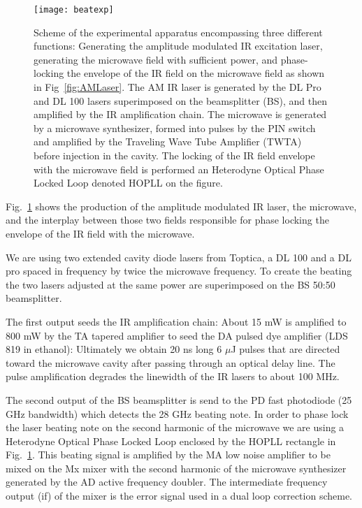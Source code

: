 \documentclass[pra, reprint]{revtex4-1}
\begin{document}
\begin{figure}[h]
  \centering
  \texttt{[image: beatexp]}

  \caption{Scheme of the experimental apparatus encompassing three different functions: Generating the amplitude modulated IR excitation laser, generating the microwave field with sufficient power, and phase-locking the envelope of the IR field on the microwave field as shown in Fig~\ref{fig:AMLaser}.
The AM IR laser is generated by the DL Pro and DL 100 lasers superimposed on the beamsplitter (BS), and then amplified by the IR amplification chain. The microwave is generated by a microwave synthesizer, formed into pulses by the PIN switch and amplified by the Traveling Wave Tube Amplifier (TWTA) before injection in the cavity.
 The locking of the IR field envelope with the microwave field is performed an Heterodyne Optical Phase Locked Loop denoted HOPLL on the figure.}
  \label{fig:exp_scheme}
\end{figure}


Fig.~\ref{fig:exp_scheme} shows the production of the amplitude modulated IR laser, the microwave, and the interplay between those two fields responsible for phase locking the envelope of the IR field with the microwave.


We are using two extended cavity diode lasers from Toptica, a DL 100 and a DL pro spaced in frequency by twice the microwave frequency. To create the beating the two lasers adjusted at the same power are superimposed on the BS 50:50 beamsplitter.

The first output seeds the IR amplification chain: About 15 mW is amplified to 800 mW by the TA tapered amplifier to seed the DA pulsed dye amplifier (LDS 819 in ethanol): Ultimately we obtain 20 ns long 6 $\mu$J pulses that are directed toward the microwave cavity after passing through an optical delay line. The pulse amplification degrades the linewidth of the IR lasers to about 100 MHz.

The second output of the BS beamsplitter is send to the PD fast photodiode (25 GHz bandwidth) which detects the 28 GHz beating note. In order to phase lock the laser beating note on the second harmonic of the microwave we are using a Heterodyne Optical Phase Locked Loop enclosed by the HOPLL rectangle in Fig.~\ref{fig:exp_scheme}.
 This beating signal is amplified by the MA low noise amplifier to be mixed on the Mx mixer with the second harmonic of the microwave synthesizer generated by the AD active frequency doubler. The intermediate frequency output (if) of the mixer is the error signal used in a dual loop correction scheme.
\end{document}
